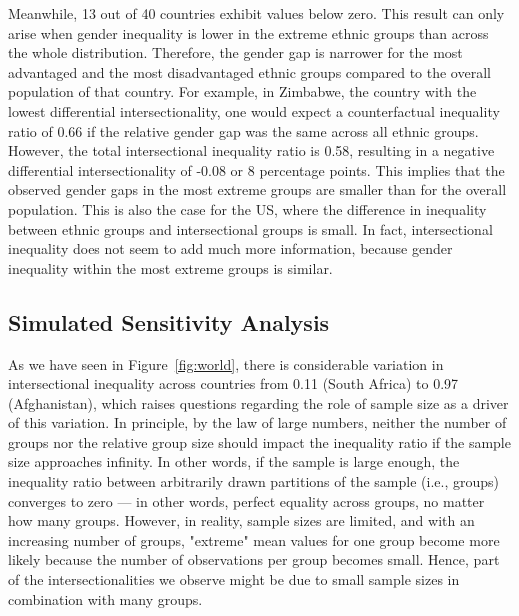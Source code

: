 Meanwhile, 13 out of 40 countries exhibit values below zero. This result can only arise when gender inequality is lower in the extreme ethnic groups than across the whole distribution. Therefore, the gender gap is narrower for the most advantaged and the most disadvantaged ethnic groups compared to the overall population of that country. For example, in Zimbabwe, the country with the lowest differential intersectionality, one would expect a counterfactual inequality ratio of 0.66 if the relative gender gap was the same across all ethnic groups. However, the total intersectional inequality ratio is 0.58, resulting in a negative differential intersectionality of -0.08 or 8 percentage points. This implies that the observed gender gaps in the most extreme groups are smaller than for the overall population. This is also the case for the US, where the difference in inequality between ethnic groups and intersectional groups is small. In fact, intersectional inequality does not seem to add much more information, because gender inequality within the most extreme groups is similar. 

\hypertarget{sensitivity}{%
\subsection{Simulated Sensitivity Analysis}\label{sensitivity}}

As we have seen in Figure~\ref{fig:world}, there is considerable variation in intersectional inequality across countries from 0.11 (South Africa) to 0.97 (Afghanistan), which raises questions regarding the role of sample size as a driver of this variation. In principle, by the law of large numbers, neither the number of groups nor the relative group size should impact the inequality ratio if the sample size approaches infinity. In other words, if the sample is large enough, the inequality ratio between arbitrarily drawn partitions of the sample (i.e., groups) converges to zero --- in other words, perfect equality across groups, no matter how many groups. However, in reality, sample sizes are limited, and with an increasing number of groups, "extreme" mean values for one group become more likely because the number of observations per group becomes small. Hence, part of the intersectionalities we observe might be due to small sample sizes in combination with many groups.

